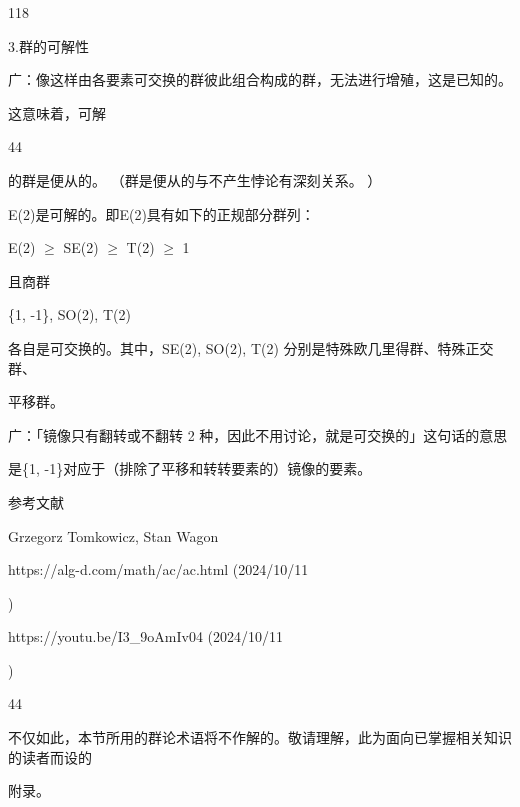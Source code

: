 118\par
3.群的可解性\par
广：像这样由各要素可交换的群彼此组合构成的群，无法进行增殖，这是已知的。\par
这意味着，可解\par
44\par
的群是便从的。 （群是便从的与不产生悖论有深刻关系。 ）\par
E(2)是可解的。即E(2)具有如下的正规部分群列：\par
E(2) $\geq$ SE(2) $\geq$ T(2) $\geq$ 1\par
且商群\par
\{1, -1\}, SO(2), T(2)\par
各自是可交换的。其中，SE(2), SO(2), T(2) 分别是特殊欧几里得群、特殊正交群、\par
平移群。\par
广：「镜像只有翻转或不翻转 2 种，因此不用讨论，就是可交换的」这句话的意思\par
是\{1, -1\}对应于（排除了平移和转转要素的）镜像的要素。\par
参考文献\par
Grzegorz Tomkowicz, Stan Wagon\par
https://alg-d.com/math/ac/ac.html (2024/10/11\par
)\par
https://youtu.be/I3\_9oAmIv04 (2024/10/11\par
)\par
44\par
不仅如此，本节所用的群论术语将不作解的。敬请理解，此为面向已掌握相关知识的读者而设的\par
附录。\par

